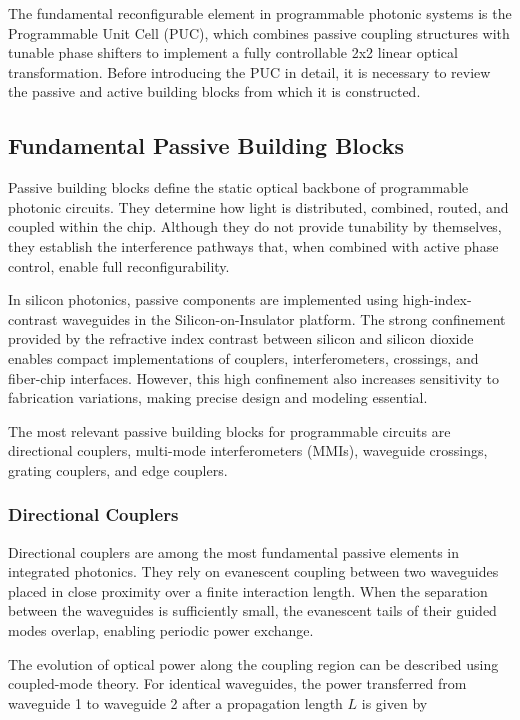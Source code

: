 The fundamental reconfigurable element in programmable photonic systems is the Programmable Unit 
Cell (PUC), which combines passive coupling structures with tunable phase shifters to implement a 
fully controllable 2x2 linear optical transformation. Before introducing the PUC in detail, it is 
necessary to review the passive and active building blocks from which it is constructed.

\subsection{Fundamental Passive Building Blocks}\label{sec:passive_bb}

Passive building blocks define the static optical backbone of programmable photonic circuits. They 
determine how light is distributed, combined, routed, and coupled within the chip. Although they 
do not provide tunability by themselves, they establish the interference pathways that, when 
combined with active phase control, enable full reconfigurability.

In silicon photonics, passive components are implemented using high-index-contrast waveguides in 
the Silicon-on-Insulator platform. The strong confinement provided by the refractive index 
contrast between silicon and silicon dioxide enables compact implementations of couplers, 
interferometers, crossings, and fiber-chip interfaces. However, this high confinement also 
increases sensitivity to fabrication variations, making precise design and modeling essential.

The most relevant passive building blocks for programmable circuits are directional couplers, 
multi-mode interferometers (MMIs), waveguide crossings, grating couplers, and edge couplers.

\subsubsection*{Directional Couplers}

Directional couplers are among the most fundamental passive elements in integrated photonics. 
They rely on evanescent coupling between two waveguides placed in close proximity over a finite 
interaction length. When the separation between the waveguides is sufficiently small, the 
evanescent tails of their guided modes overlap, enabling periodic power exchange.

The evolution of optical power along the coupling region can be described using coupled-mode 
theory. For identical waveguides, the power transferred from waveguide 1 to waveguide 2 after a 
propagation length $L$ is given by

